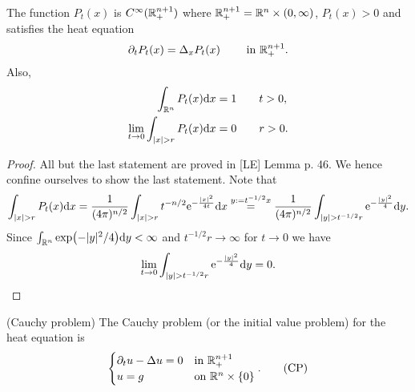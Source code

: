 \documentclass[11pt]{article}
\begin{document}
			\begin{lemma}\label{lem--heatkernel}
				The function $P_t(x)$ is $C^\infty(\mathbb{R}^{n+1}_+)$ where $\mathbb{R}^{n+1}_+=\mathbb{R}^n\times(0,\infty)$, $P_t(x)>0$ and satisfies the heat equation
				\begin{equation*}
					\partial_tP_t(x)=\Delta_xP_t(x)\qquad\text{ in }\mathbb{R}^{n+1}_+.
				\end{equation*}
				Also,
				\begin{align*}
					\int_{\R^n}P_t(x)\mathrm{d}x&=1\qquad t>0,\\
					\lim_{t\to0}\int_{|x|>r}P_t(x)\mathrm{d}x&=0\qquad r>0.
				\end{align*}
			\end{lemma}
			\begin{proof}
				All but the last statement are proved in [LE] Lemma p. 46. We hence confine ourselves to show the last statement. Note that
				\begin{equation*}
					\int_{|x|>r}P_t(x)\mathrm{d}x=\frac{1}{(4\pi)^{n/2}}\int_{|x|>r}t^{-n/2}\e{-\frac{|x|^2}{4t}}\mathrm{d}x\overset{y:=t^{-1/2}x}{=}\frac{1}{(4\pi)^{n/2}}\int_{|y|>t^{-1/2}r}\e{-\frac{|y|^2}{4}}\mathrm{d}y.
				\end{equation*}
				Since $\int_{\mathbb{R}^n}\exp(-|y|^2/4)\mathrm{d}y<\infty$ and $t^{-1/2}r\to\infty$ for $t\to0$ we have
				\begin{equation*}
					\lim_{t\to0}\int_{|y|>t^{-1/2}r}\e{-\frac{|y|^2}{4}}\mathrm{d}y=0.
				\end{equation*}
			\end{proof}

			\begin{defi}(Cauchy problem)
				The Cauchy problem (or the initial value problem) for the heat equation is
				\begin{equation}
					\begin{cases}
						\partial_tu-\Delta u=0 & \text{in }\mathbb{R}^{n+1}_+\\
						u=g & \text{on }\mathbb{R}^n\times\{0\}
					\end{cases}.\tag{CP}\label{eq--cauchy}
				\end{equation}
			\end{defi}
\end{document}
